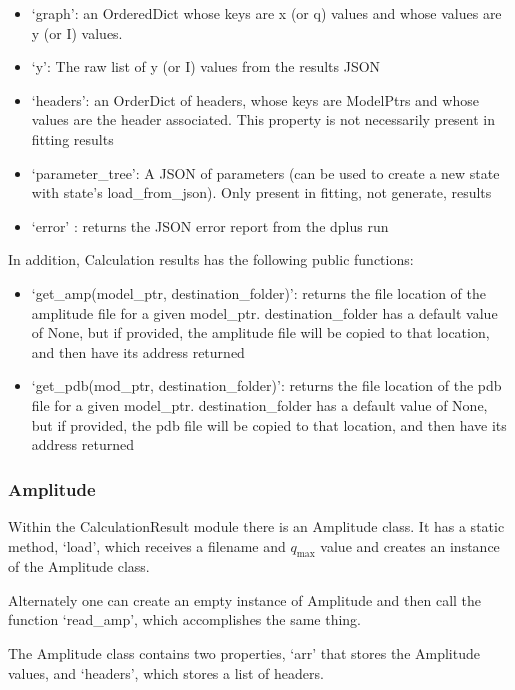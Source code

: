 \documentclass[../D+Manual.tex]{subfiles}
\begin{document}
\begin{itemize}
	\tightlist
	\item
	`graph': an OrderedDict whose keys are x (or q) values and whose values are y (or I)
	values.
	\item
	`y': The raw list of y (or I) values from the results JSON
	\item
	`headers': an OrderDict of headers, whose keys are ModelPtrs and whose
	values are the header associated. This property is not necessarily
	present in fitting results
	\item
	`parameter\_tree': A JSON of parameters (can be used to create a new
	state with state's load\_from\_json). Only present in fitting, not
	generate, results
	\item
	`error' : returns the JSON error report from the dplus run
\end{itemize}

In addition, Calculation results has the following public functions:

\begin{itemize}
	\tightlist
	\item
	`get\_amp(model\_ptr, destination\_folder)': returns the file location
	of the amplitude file for a given model\_ptr. destination\_folder has a
	default value of None, but if provided, the amplitude file will be
	copied to that location, and then have its address returned
	\item
	`get\_pdb(mod\_ptr, destination\_folder)': returns the file location
	of the pdb file for a given model\_ptr. destination\_folder has a
	default value of None, but if provided, the pdb file will be copied to
	that location, and then have its address returned
\end{itemize}

\subsubsection{Amplitude}\label{amplitude}

Within the CalculationResult module there is an Amplitude class. It has
a static method, `load', which receives a filename and $q_{\text{max}}$ value and
creates an instance of the Amplitude class.

Alternately one can create an empty instance of Amplitude and then call
the function `read\_amp', which accomplishes the same thing.

The Amplitude class contains two properties, `arr'
that stores the Amplitude values, and
`headers', which stores a list of headers.
\end{document}
